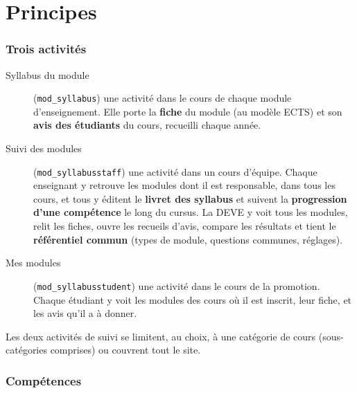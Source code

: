 \documentclass[11pt,a4paper]{article}
\begin{document}
\newpage
\part{Principes}\label{part:principes}

\section{Trois activités}

\begin{description}
  \item[Syllabus du module] (\texttt{mod\_syllabus}) une activité dans le cours de chaque module
    d'enseignement. Elle porte la \textbf{fiche} du module (au modèle ECTS) et son
    \textbf{avis des étudiants} du cours, recueilli chaque année.
  \item[Suivi des modules] (\texttt{mod\_syllabusstaff}) une activité dans un cours d'équipe.
    Chaque enseignant y retrouve les modules dont il est responsable, dans tous les cours, et
    tous y éditent le \textbf{livret des syllabus} et suivent la \textbf{progression d'une
    compétence} le long du cursus. La DEVE y voit tous les modules, relit les fiches, ouvre les recueils d'avis, compare les résultats
    et tient le \textbf{référentiel commun} (types de module, questions communes, réglages).
  \item[Mes modules] (\texttt{mod\_syllabusstudent}) une activité dans le cours de la
    promotion. Chaque étudiant y voit les modules des cours où il est inscrit, leur fiche, et
    les avis qu'il a à donner.
\end{description}

Les deux activités de suivi se limitent, au choix, à une catégorie de cours (sous-catégories
comprises) ou couvrent tout le site.

\section{Compétences}\label{sec:competences}
\end{document}
